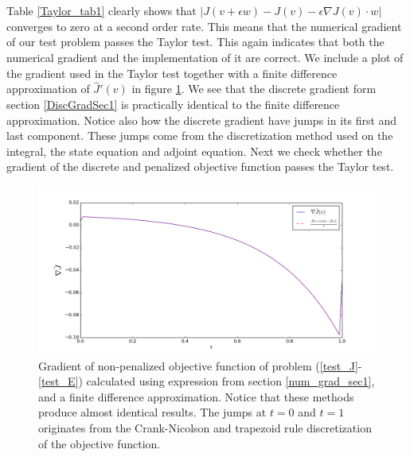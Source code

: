 \\
\\
Table \ref{Taylor_tab1} clearly shows that $|J(v+\epsilon w)-J(v)-\epsilon \nabla J(v)\cdot w|$ converges to zero at a second order rate. This means that the numerical gradient of our test problem passes the Taylor test. This again indicates that both the numerical gradient and the implementation of it are correct. We include a plot of the gradient used in the Taylor test together with a finite difference approximation of $\hat J'(v)$ in figure \ref{JGrad1}. We see that the discrete gradient form section \ref{DiscGradSec1} is practically identical to the finite difference approximation. Notice also how the discrete gradient have jumps in its first and last component. These jumps come from the discretization method used on the integral, the state equation and adjoint equation. Next we check whether the gradient of the discrete and penalized objective function passes the Taylor test.
\begin{figure}[h]
\centering
\includegraphics[scale=0.5]{num_grad.png}
\caption{Gradient of non-penalized objective function of problem (\ref{test_J}-\ref{test_E}) calculated using expression from section \ref{num_grad_sec1}, and a finite difference approximation. Notice that these methods produce almost identical results. The jumps at $t=0$ and $t=1$ originates from the Crank-Nicolson and trapezoid rule discretization of the objective function.}
\label{JGrad1}
\end{figure}
